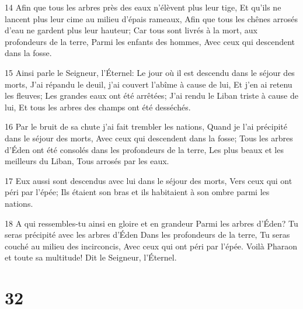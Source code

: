 \par 14 Afin que tous les arbres près des eaux n'élèvent plus leur tige, Et qu'ils ne lancent plus leur cime au milieu d'épais rameaux, Afin que tous les chênes arrosés d'eau ne gardent plus leur hauteur; Car tous sont livrés à la mort, aux profondeurs de la terre, Parmi les enfants des hommes, Avec ceux qui descendent dans la fosse.
\par 15 Ainsi parle le Seigneur, l'Éternel: Le jour où il est descendu dans le séjour des morts, J'ai répandu le deuil, j'ai couvert l'abîme à cause de lui, Et j'en ai retenu les fleuves; Les grandes eaux ont été arrêtées; J'ai rendu le Liban triste à cause de lui, Et tous les arbres des champs ont été desséchés.
\par 16 Par le bruit de sa chute j'ai fait trembler les nations, Quand je l'ai précipité dans le séjour des morts, Avec ceux qui descendent dans la fosse; Tous les arbres d'Éden ont été consolés dans les profondeurs de la terre, Les plus beaux et les meilleurs du Liban, Tous arrosés par les eaux.
\par 17 Eux aussi sont descendus avec lui dans le séjour des morts, Vers ceux qui ont péri par l'épée; Ils étaient son bras et ils habitaient à son ombre parmi les nations.
\par 18 A qui ressembles-tu ainsi en gloire et en grandeur Parmi les arbres d'Éden? Tu seras précipité avec les arbres d'Éden Dans les profondeurs de la terre, Tu seras couché au milieu des incirconcis, Avec ceux qui ont péri par l'épée. Voilà Pharaon et toute sa multitude! Dit le Seigneur, l'Éternel.

\chapter{32}

